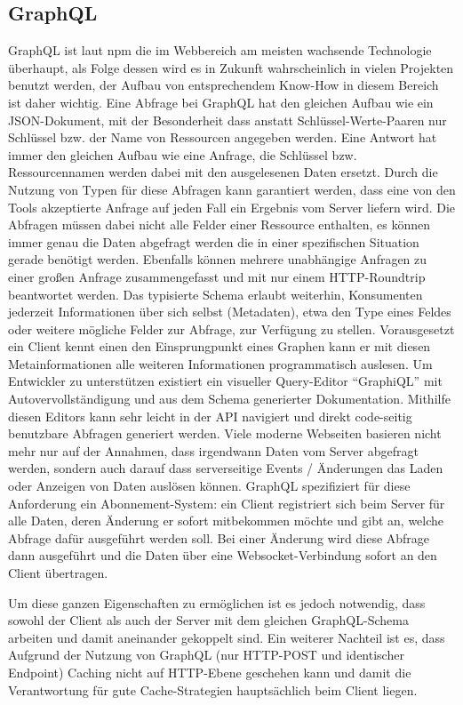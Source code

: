\subsection{GraphQL}
GraphQL ist laut npm  die im Webbereich am meisten wachsende Technologie überhaupt, als Folge dessen wird es in Zukunft wahrscheinlich in vielen Projekten benutzt werden, der Aufbau von entsprechendem Know-How in diesem Bereich ist daher wichtig.
Eine Abfrage bei GraphQL hat den gleichen Aufbau wie ein JSON-Dokument, mit der Besonderheit dass anstatt Schlüssel-Werte-Paaren nur Schlüssel bzw. der Name von Ressourcen angegeben werden. Eine Antwort hat immer den gleichen Aufbau wie eine Anfrage, die Schlüssel bzw. Ressourcennamen werden dabei mit den ausgelesenen Daten ersetzt. Durch die Nutzung von Typen für diese Abfragen kann garantiert werden, dass eine von den Tools akzeptierte Anfrage auf jeden Fall ein Ergebnis vom Server liefern wird. Die Abfragen müssen dabei nicht alle Felder einer Ressource enthalten, es können immer genau die Daten abgefragt werden die in einer spezifischen Situation gerade benötigt werden. Ebenfalls können mehrere unabhängige Anfragen zu einer großen Anfrage zusammengefasst und mit nur einem HTTP-Roundtrip beantwortet werden.
Das typisierte Schema erlaubt weiterhin, Konsumenten jederzeit Informationen über sich selbst (Metadaten), etwa den Type eines Feldes oder weitere mögliche Felder zur Abfrage, zur Verfügung zu stellen. Vorausgesetzt ein Client kennt einen den Einsprungpunkt eines Graphen kann er mit diesen Metainformationen alle weiteren Informationen programmatisch auslesen. 
Um Entwickler zu unterstützen existiert ein visueller Query-Editor ``GraphiQL'' mit Autovervollständigung und aus dem Schema generierter Dokumentation. Mithilfe diesen Editors kann sehr leicht in der API navigiert und direkt code-seitig benutzbare Abfragen generiert werden.
Viele moderne Webseiten basieren nicht mehr nur auf der Annahmen, dass irgendwann Daten vom Server abgefragt werden, sondern auch darauf dass serverseitige Events / Änderungen das Laden oder Anzeigen von Daten auslösen können. GraphQL spezifiziert für diese Anforderung ein Abonnement-System: ein Client registriert sich beim Server für alle Daten, deren Änderung er sofort mitbekommen möchte und gibt an, welche Abfrage dafür ausgeführt werden soll. Bei einer Änderung wird diese Abfrage dann ausgeführt und die Daten über eine Websocket-Verbindung sofort an den Client übertragen.

Um diese ganzen Eigenschaften zu ermöglichen ist es jedoch notwendig, dass sowohl der Client als auch der Server mit dem gleichen GraphQL-Schema arbeiten und damit aneinander gekoppelt sind.
Ein weiterer Nachteil ist es, dass Aufgrund der Nutzung von GraphQL (nur HTTP-POST und identischer Endpoint) Caching nicht auf HTTP-Ebene geschehen kann und damit die Verantwortung für gute Cache-Strategien hauptsächlich beim Client liegen.

